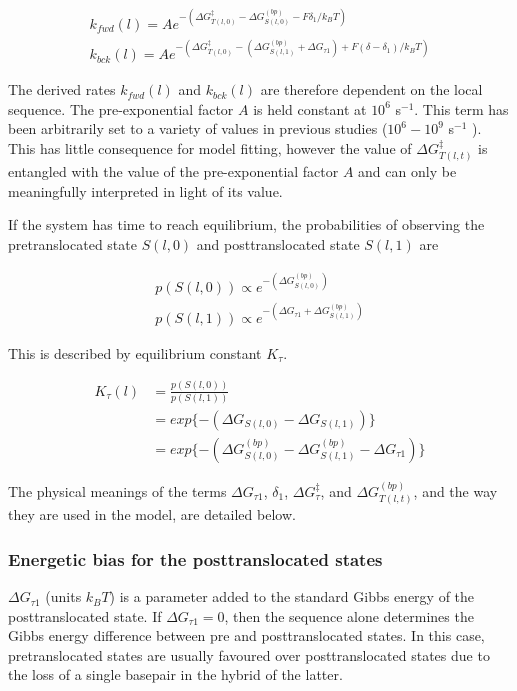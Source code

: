 \documentclass[10pt,letterpaper]{article}
\begin{document}
\begin{eqnarray}
    k_{fwd}(l) = Ae^{-(\Delta G_{T(l,0)}^{\ddag} - \Delta G_{S(l,0)}^{(bp)} - F \delta_1 / k_BT )} \\
    k_{bck}(l) = Ae^{-(\Delta G_{T(l,0)}^{\ddag} - (\Delta G_{S(l,1)}^{(bp)} + \Delta G_{\tau 1}) + F (\delta - \delta_1) / k_BT)}
\end{eqnarray}

The derived rates $k_{fwd}(l)$ and $k_{bck}(l)$ are therefore dependent on the local sequence. The pre-exponential factor $A$ is held constant at $10^6$ s$^{-1}$. This term has been arbitrarily set to a variety of values in previous studies ($10^6 - 10^9$ s$^{-1}$ \cite{bai2004sequence, tadigotla2006thermodynamic, maoileidigh2011unified}). This has little consequence for model fitting, however the value of $\Delta G_{T(l,t)}^{\ddag}$ is entangled with the value of the pre-exponential factor $A$ and can only be meaningfully interpreted in light of its value.



If the system has time to reach equilibrium, the probabilities of observing the pretranslocated state $S(l,0)$ and posttranslocated state $S(l,1)$ are


\begin{eqnarray}
\label{eq:DGpost}
p(S(l,0)) \propto e^{-(\Delta G^{(bp)}_{S(l,0)})} \\
p(S(l,1)) \propto e^{-(\Delta G_{\tau 1} + \Delta G^{(bp)}_{S(l,1)})}
\end{eqnarray}



This is described by equilibrium constant $K_\tau$.

\begin{align}
\label{eq:DGpostEquilibrium}
K_\tau(l) &= \frac{p(S(l,0))}{p(S(l,1))} \\
&= exp\{ -(\Delta G_{S(l,0)} -  \Delta G_{S(l,1)} ) \} \\
 &= exp\{ -(\Delta G^{(bp)}_{S(l,0)} -  \Delta G^{(bp)}_{S(l,1)} - \Delta G _{\tau 1} ) \}
\end{align}



The physical meanings of the terms $\Delta G_{\tau 1}$, $\delta_1$, $\Delta G^\ddag_{\tau}$, and $\Delta G_{T(l,t)}^{(bp)}$, and the way they are used in the model, are detailed below.


\subsubsection*{Energetic bias for the posttranslocated states}
$\Delta G_{\tau 1}$ (units $k_BT$) is a parameter added to the standard Gibbs energy of the posttranslocated state. If $\Delta G_{\tau 1} = 0$, then the sequence alone determines the Gibbs energy difference between pre and posttranslocated states. In this case, pretranslocated states are usually favoured over posttranslocated states due to the loss of a single basepair in the hybrid of the latter.
\end{document}
